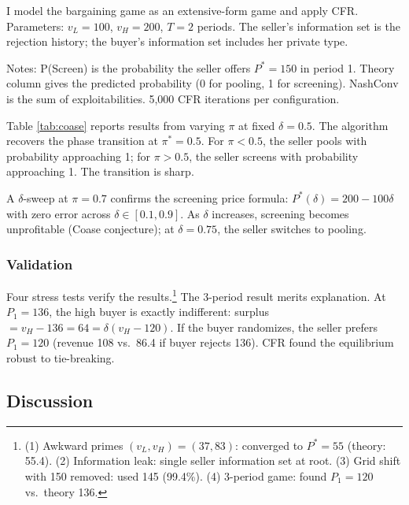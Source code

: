 I model the bargaining game as an extensive-form game and apply CFR. Parameters: $v_L = 100$, $v_H = 200$, $T = 2$ periods. The seller's information set is the rejection history; the buyer's information set includes her private type.

\begin{table}[htbp]
\centering
\caption{CFR Equilibrium vs. Theory: $\pi$-sweep at $\delta = 0.5$}
\label{tab:coase}

\begin{minipage}{0.9\textwidth}
\footnotesize
Notes: P(Screen) is the probability the seller offers $P^* = 150$ in period 1. Theory column gives the predicted probability (0 for pooling, 1 for screening). NashConv is the sum of exploitabilities. 5,000 CFR iterations per configuration.
\end{minipage}
\end{table}

Table \ref{tab:coase} reports results from varying $\pi$ at fixed $\delta = 0.5$. The algorithm recovers the phase transition at $\pi^* = 0.5$. For $\pi < 0.5$, the seller pools with probability approaching 1; for $\pi > 0.5$, the seller screens with probability approaching 1. The transition is sharp.

A $\delta$-sweep at $\pi = 0.7$ confirms the screening price formula: $P^*(\delta) = 200 - 100\delta$ with zero error across $\delta \in [0.1, 0.9]$. As $\delta$ increases, screening becomes unprofitable (Coase conjecture); at $\delta = 0.75$, the seller switches to pooling.

\subsubsection{Validation}

Four stress tests verify the results.\footnote{(1) Awkward primes $(v_L, v_H) = (37, 83)$: converged to $P^* = 55$ (theory: 55.4). (2) Information leak: single seller information set at root. (3) Grid shift with 150 removed: used 145 (99.4\%). (4) 3-period game: found $P_1 = 120$ vs.\ theory 136.} The 3-period result merits explanation. At $P_1 = 136$, the high buyer is exactly indifferent: surplus $= v_H - 136 = 64 = \delta(v_H - 120)$. If the buyer randomizes, the seller prefers $P_1 = 120$ (revenue 108 vs.\ 86.4 if buyer rejects 136). CFR found the equilibrium robust to tie-breaking.

\subsection{Discussion}

